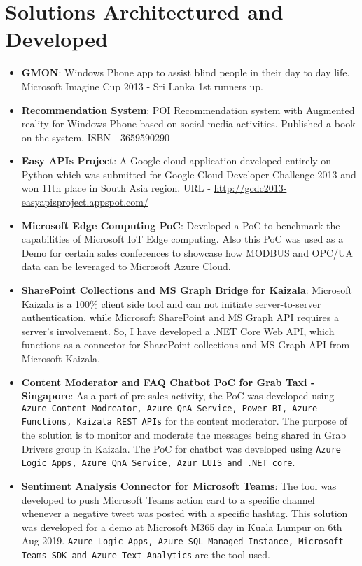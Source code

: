 \documentclass[a4paper,11pt]{article}
\newcommand{\resumeItem}[2]{
  \item\small{
    \textbf{#1}{: #2 \vspace{-2pt}}
  }
}
\newcommand{\resumeSubItem}[2]{\resumeItem{#1}{#2}\vspace{-4pt}}
\newcommand{\resumeSubHeadingListStart}{\begin{itemize}[leftmargin=*]}
\newcommand{\resumeSubHeadingListEnd}{\end{itemize}}
\begin{document}
\section{Solutions Architectured and Developed}
  \resumeSubHeadingListStart
    \resumeSubItem{GMON}
      {Windows Phone app to assist blind people in their day to day life. Microsoft Imagine Cup 2013 - Sri Lanka 1st runners up.}
    \resumeSubItem{Recommendation System}
      {POI Recommendation system with Augmented reality for Windows Phone based on social media activities. Published a book on the system. ISBN - 3659590290}
    \resumeSubItem{Easy APIs Project}
      {A Google cloud application developed entirely on Python which was submitted for Google Cloud Developer Challenge 2013 and won 11th place in South Asia region. URL - \href{http://gcdc2013-easyapisproject.appspot.com/}{http://gcdc2013-easyapisproject.appspot.com/}}
    \resumeSubItem{Microsoft Edge Computing PoC}
      {Developed a PoC to benchmark the capabilities of Microsoft IoT Edge computing. Also this PoC was used as a Demo for certain sales conferences to showcase how MODBUS and OPC/UA data can be leveraged to Microsoft Azure Cloud.}
    \resumeSubItem{SharePoint Collections and MS Graph Bridge for Kaizala}
      {Microsoft Kaizala is a 100\% client side tool and can not initiate server-to-server authentication, while Microsoft SharePoint and MS Graph API requires a server's involvement. So, I have developed a .NET Core Web API, which functions as a connector for SharePoint collections and MS Graph API from Microsoft Kaizala.}
    \resumeSubItem{Content Moderator and FAQ Chatbot PoC for Grab Taxi - Singapore}
      {As a part of pre-sales activity, the PoC was developed using \texttt{Azure Content Modreator, Azure QnA Service, Power BI, Azure Functions, Kaizala REST APIs} for the content moderator. The purpose of the solution is to monitor and moderate the messages being shared in Grab Drivers group in Kaizala. The PoC for chatbot was developed using \texttt{Azure Logic Apps, Azure QnA Service, Azur   LUIS and .NET core}.}
    \resumeSubItem{Sentiment Analysis Connector for       Microsoft Teams}{The tool was   developed to push   Microsoft Teams action card to a specific channel   whenever   a negative tweet was posted with a       specific hashtag. This solution was developed for a demo at Microsoft M365 day in Kuala Lumpur on 6th Aug 2019.   \texttt{Azure Logic Apps, Azure SQL Managed Instance, Microsoft Teams SDK and Azure Text Analytics} are the tool used.}
  \resumeSubHeadingListEnd
\end{document}
